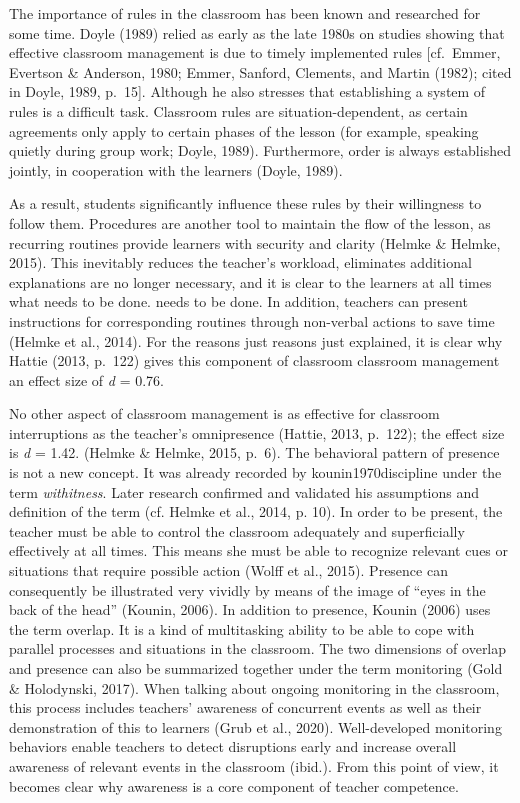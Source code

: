 \documentclass[
  man]{apa6}
\begin{document}
The importance of rules in the classroom has been known and researched for some time. Doyle (1989) relied as early as the late 1980s on studies showing that effective classroom management is due to timely implemented rules {[}cf.~Emmer, Evertson \& Anderson, 1980; Emmer, Sanford, Clements, and Martin (1982); cited in Doyle, 1989, p.~15{]}. Although he also stresses that establishing a system of rules is a difficult task. Classroom rules are situation-dependent, as certain agreements only apply to certain phases of the lesson (for example, speaking quietly during group work; Doyle, 1989). Furthermore, order is always established jointly, in cooperation with the learners (Doyle, 1989).

As a result, students significantly influence these rules by their willingness to follow them. Procedures are another tool to maintain the flow of the lesson, as recurring routines provide learners with security and clarity (Helmke \& Helmke, 2015). This inevitably reduces the teacher's workload, eliminates additional explanations are no longer necessary, and it is clear to the learners at all times what needs to be done. needs to be done. In addition, teachers can present instructions for corresponding routines through non-verbal actions to save time (Helmke et al., 2014). For the reasons just reasons just explained, it is clear why Hattie (2013, p.~122) gives this component of classroom classroom management an effect size of \emph{d} = 0.76.

No other aspect of classroom management is as effective for classroom interruptions as the teacher's omnipresence (Hattie, 2013, p.~122); the effect size is \emph{d} = 1.42. (Helmke \& Helmke, 2015, p.~6). The behavioral pattern of presence is not a new concept. It was already recorded by kounin1970discipline under the term \emph{withitness}. Later research confirmed and validated his assumptions and definition of the term (cf. Helmke et al., 2014, p. 10). In order to be present, the teacher must be able to control the classroom adequately and superficially effectively at all times. This means she must be able to recognize relevant cues or situations that require possible action (Wolff et al., 2015). Presence can consequently be illustrated very vividly by means of the image of ``eyes in the back of the head'' (Kounin, 2006). In addition to presence, Kounin (2006) uses the term overlap. It is a kind of multitasking ability to be able to cope with parallel processes and situations in the classroom. The two dimensions of overlap and presence can also be summarized together under the term monitoring (Gold \& Holodynski, 2017). When talking about ongoing monitoring in the classroom, this process includes teachers' awareness of concurrent events as well as their demonstration of this to learners (Grub et al., 2020). Well-developed monitoring behaviors enable teachers to detect disruptions early and increase overall awareness of relevant events in the classroom (ibid.). From this point of view, it becomes clear why awareness is a core component of teacher competence.
\end{document}
